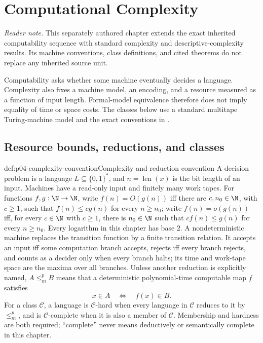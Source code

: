 
\chapter{Computational Complexity}
\label{sec:p04-complexity}

\noindent\textit{Reader note.} This separately authored chapter extends the
exact inherited computability sequence with standard complexity and
descriptive-complexity results.  Its machine conventions, class definitions,
and cited theorems do not replace any inherited source unit.

Computability asks whether some machine eventually decides a language.
Complexity also fixes a machine model, an encoding, and a resource measured as
a function of input length.  Formal-model equivalence therefore does not imply
equality of time or space costs.  The classes below use a standard multitape
Turing-machine model and the exact conventions in
\cite[chaps.~1--5]{AroraBarak2009}.

\section{Resource bounds, reductions, and classes}
\label{sec:p04-complexity-classes}

\begin{hbconvention}{def:p04-complexity-convention}{Complexity and reduction convention}
A decision problem is a language \(L\subseteq\{0,1\}^*\), and
\(n=\operatorname{len}(x)\) is the bit length of an input.  Machines have a read-only
input and finitely many work tapes.  For functions \(f,g:\N\to\N\), write
\(f(n)=O(g(n))\) iff there are \(c,n_0\in\N\), with \(c\geq1\), such that
\(f(n)\leq c g(n)\) for every \(n\geq n_0\); write \(f(n)=o(g(n))\) iff,
for every \(c\in\N\) with \(c\geq1\), there is \(n_0\in\N\) such that
\(c f(n)\leq g(n)\) for every \(n\geq n_0\).  Every logarithm in this
chapter has base \(2\).  A nondeterministic machine replaces the transition
function by a finite transition relation.  It accepts an input iff some
computation branch accepts, rejects iff every branch rejects, and counts as a
decider only when every branch halts; its time and work-tape space are the
maxima over all branches.  Unless another reduction is explicitly
named, \(A\leq_m^pB\) means that a deterministic polynomial-time computable
map \(f\) satisfies
\[
 x\in A\quad\Leftrightarrow\quad f(x)\in B.
\]
For a class \(\mathcal C\), a language is \(\mathcal C\)-hard when every
language in \(\mathcal C\) reduces to it by \(\leq_m^p\), and is
\(\mathcal C\)-complete when it is also a member of \(\mathcal C\).
Membership and hardness are both required; ``complete'' never means
deductively or semantically complete in this chapter.
\end{hbconvention}

